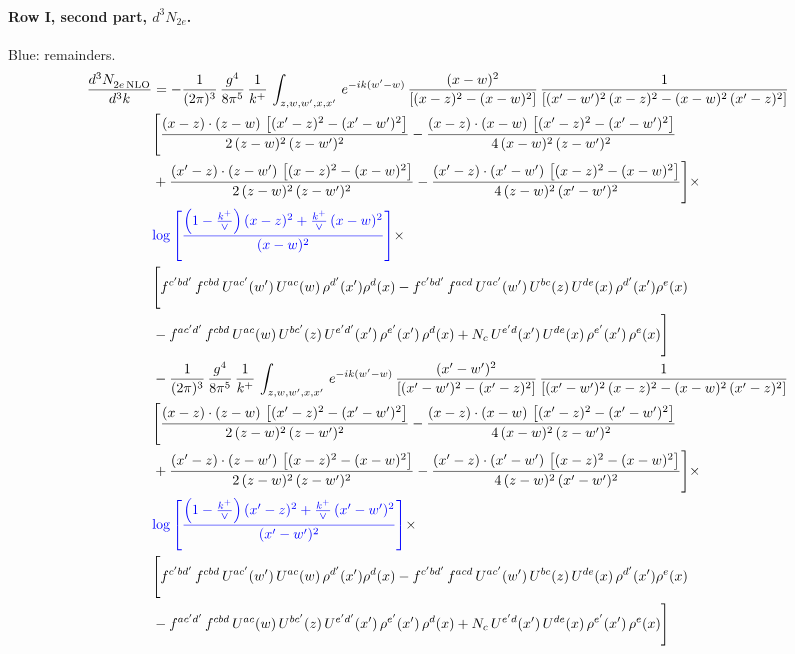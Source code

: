 \documentclass[10pt]{article}
\numberwithin{equation}{section}
\newcommand{\new}[1]{{\color{blue}#1}}
\begin{document}
\paragraph{Row I, second part, $d^3N_{2e}$.}
\new{Blue}: remainders.
\begin{align}
 \frac{d^{3}N_{2e\,\rm NLO}^{\rm}}{d^{3}k}  & =   -\frac{1}{(2\pi)^{3}}\, \frac{g^{4}}{8\pi^{5}}\,\frac{1}{k^{+}}\,\int_{z,w,w^{\prime},x,x'}\, e^{-ik(w^{\prime}-w)}\,\frac{(x-w)^{2}}{\left[(x-z)^{2}-(x-w)^{2}\right]}\, \frac{1}{\left[(x'-w')^{2}\, (x-z)^{2} - (x-w)^{2}\, (x'-z)^{2}\right]} \notag \\ & \Bigg[\frac{(x-z)\cdot (z-w)\, \left[(x'-z)^{2}-(x'-w')^{2}\right]}{2\, (z-w)^{2}\, (z-w')^{2}}  - \frac{(x-z)\cdot (x-w)\,\left[(x'-z)^{2}-(x'-w')^{2}\right] }{4\,(x-w)^{2}\,(z-w')^{2}}\notag \\ & +\frac{(x'-z)\cdot (z-w')\, \left[(x-z)^{2}-(x-w)^{2}\right]}{2\, (z-w)^{2}\, (z-w')^{2}}-\frac{(x'-z)\cdot (x'-w')\, \left[(x-z)^{2}-(x-w)^{2}\right]}{4\, (z-w)^{2}\,(x'-w')^{2}}\Bigg]\times\,\notag \\ & \new{\log{\left[\frac{\left(1-\frac{k^{+}}{\vee}\right)(x-z)^{2}+\frac{k^{+}}{\vee}\,(x-w)^{2}}{(x-w)^{2}}\right]}}\times\,\notag \\ & \Bigg[f^{c'bd'}\,f^{cbd}\, U^{ac'}(w')\,U^{ac}(w)\,\rho^{d'}(x')\rho^{d}(x)- f^{c'bd'}\,f^{acd}\,U^{ac'}(w')\,U^{bc}(z)\,U^{de}(x)\,\rho^{d'}(x')\rho^{e}(x) \notag \\ & -f^{ac'd'}\,f^{cbd}\,U^{ac}(w)\,U^{bc'}(z)\,U^{e'd'}(x')\,\rho^{e'}(x')\,\rho^{d}(x) +N_{c}\,U^{e'd}(x')\,U^{de}(x)\,\rho^{e'}(x')\,\rho^{e}(x)\Bigg] \notag \\
& -\frac{1}{(2\pi)^{3}}\, \frac{g^{4}}{8\pi^{5}}\,\frac{1}{k^{+}}\,\int_{z,w,w^{\prime},x,x'}\, e^{-ik(w^{\prime}-w)}\, \frac{(x'-w')^{2}}{\left[(x'-w')^{2}-(x'-z)^{2}\right]}\, \frac{1}{\left[(x'-w')^{2}\, (x-z)^{2} - (x-w)^{2}\, (x'-z)^{2}\right]}  \notag \\ & \Bigg[\frac{(x-z)\cdot (z-w)\, \left[(x'-z)^{2}-(x'-w')^{2}\right]}{2\, (z-w)^{2}\, (z-w')^{2}}  - \frac{(x-z)\cdot (x-w)\,\left[(x'-z)^{2}-(x'-w')^{2}\right] }{4\,(x-w)^{2}\,(z-w')^{2}}\notag \\ & +\frac{(x'-z)\cdot (z-w')\, \left[(x-z)^{2}-(x-w)^{2}\right]}{2\, (z-w)^{2}\, (z-w')^{2}}-\frac{(x'-z)\cdot (x'-w')\, \left[(x-z)^{2}-(x-w)^{2}\right]}{4\, (z-w)^{2}\,(x'-w')^{2}}\Bigg]\times\,\notag \\ & \new{\log{\left[\frac{\left(1-\frac{k^{+}}{\vee}\right)(x'-z)^{2}+\frac{k^{+}}{\vee}\,(x'-w')^{2}}{(x'-w')^{2}}\right]}}\times\notag \\ & \Bigg[f^{c'bd'}\,f^{cbd}\, U^{ac'}(w')\,U^{ac}(w)\,\rho^{d'}(x')\rho^{d}(x)- f^{c'bd'}\,f^{acd}\,U^{ac'}(w')\,U^{bc}(z)\,U^{de}(x)\,\rho^{d'}(x')\rho^{e}(x) \notag \\ & -f^{ac'd'}\,f^{cbd}\,U^{ac}(w)\,U^{bc'}(z)\,U^{e'd'}(x')\,\rho^{e'}(x')\,\rho^{d}(x) +N_{c}\,U^{e'd}(x')\,U^{de}(x)\,\rho^{e'}(x')\,\rho^{e}(x)\Bigg] \label{eq:F:G2I2e}
\end{align}
\end{document}
